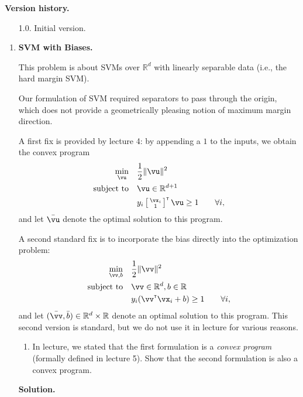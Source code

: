 \documentclass{article}
\newcommand\T{{\scriptscriptstyle\mathsf{T}}}
\def\R{\mathbb{R}}
\def\1{\mathds{1}}
\theoremstyle{definition}
\theoremstyle{remark}
\newenvironment{Q}
{%
\clearpage
\item
}
{%
\phantom{s}%
\bigskip%
\noindent\textbf{Solution.}
}
\begin{document}
\noindent\textbf{Version history.}
\begin{enumerate}
    \item[1.0.] Initial version.
\end{enumerate}

\begin{enumerate}[font={\Large\bfseries},left=0pt]

\begin{Q}
  \textbf{\Large{}SVM with Biases.}

  This problem is about SVMs over $\R^d$ with linearly separable data
  (i.e., the hard margin SVM).

  Our formulation of SVM required separators to pass through the origin, which 
  does not provide a geometrically pleasing notion of maximum margin direction.

  A first fix is provided by lecture 4: by appending a $1$ to the inputs,
  we obtain the convex program
  \begin{align*}
    \min_{\vu}\quad&\frac 1 2 \|\vu\|^2\\
    \textrm{subject to}\quad&\vu\in\R^{d+1}\\
                            &y_i \sbr[1]{\begin{smallmatrix}\vx_i\\1\end{smallmatrix}}^\T \vu
                            \geq 1\qquad\forall i,
  \end{align*}
  and let $\bar\vu$ denote the optimal solution to this program.

  A second standard fix is to incorporate the bias directly into the optimization problem:
  \begin{align*}
    \min_{\vv,b}\quad&\frac 1 2 \|\vv\|^2\\
    \textrm{subject to}\quad&\vv\in\R^{d}, b\in\R\\
                            &y_i (\vv^\T \vx_i + b) \geq 1\qquad\forall i,
  \end{align*}
  and let $(\bar\vv,\bar b) \in \R^d \times \R$ denote an optimal solution to this program.
  This second version is standard, but we do not use it in lecture for various reasons.

  \begin{enumerate}
    \item
      In lecture, we stated that the first formulation is a \emph{convex program}
      (formally defined in lecture 5).
      Show that the second formulation is also a convex program.


\end{enumerate}
\end{Q}
\end{enumerate}
\end{document}
